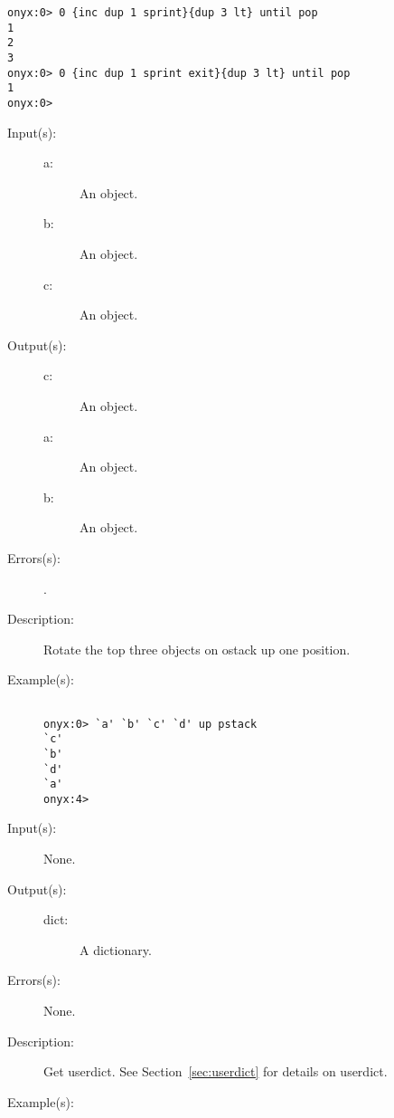 \begin{description}
\begin{description}
\begin{verbatim}
onyx:0> 0 {inc dup 1 sprint}{dup 3 lt} until pop
1
2
3
onyx:0> 0 {inc dup 1 sprint exit}{dup 3 lt} until pop
1
onyx:0>
		\end{verbatim}
	\end{description}
\label{systemdict:up}
\item[{\onyxop{a b c}{up}{c a b}}: ]
	\begin{description}\item[]
	\item[Input(s): ]
		\begin{description}\item[]
		\item[a: ]
			An object.
		\item[b: ]
			An object.
		\item[c: ]
			An object.
		\end{description}
	\item[Output(s): ]
		\begin{description}\item[]
		\item[c: ]
			An object.
		\item[a: ]
			An object.
		\item[b: ]
			An object.
		\end{description}
	\item[Errors(s): ]
		\begin{description}\item[]
		\item[.]
		\end{description}
	\item[Description: ]
		Rotate the top three objects on ostack up one position.
	\item[Example(s): ]\begin{verbatim}

onyx:0> `a' `b' `c' `d' up pstack
`c'
`b'
`d'
`a'
onyx:4>
		\end{verbatim}
	\end{description}
\label{systemdict:userdict}
\item[{\onyxop{--}{userdict}{dict}}: ]
	\begin{description}\item[]
	\item[Input(s): ] None.
	\item[Output(s): ]
		\begin{description}\item[]
		\item[dict: ]
			A dictionary.
		\end{description}
	\item[Errors(s): ] None.
	\item[Description: ]
		Get userdict.  See Section~\ref{sec:userdict} for details on
		userdict.
	\item[Example(s): ]\begin{verbatim}


\end{verbatim}
\end{description}
\end{description}
